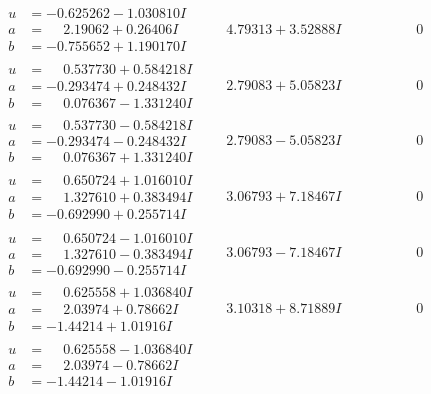 \documentclass[1p]{elsarticle_modified}
\theoremstyle{definition}
\begin{document}
$$\begin{array}{c|c|c}
\begin{aligned}
u &= -0.625262 - 1.030810 I \\
a &= \phantom{-}2.19062 + 0.26406 I \\
b &= -0.755652 + 1.190170 I\end{aligned}
 & \phantom{-}4.79313 + 3.52888 I & \phantom{-0.000000 } 0 \\ \hline\begin{aligned}
u &= \phantom{-}0.537730 + 0.584218 I \\
a &= -0.293474 + 0.248432 I \\
b &= \phantom{-}0.076367 - 1.331240 I\end{aligned}
 & \phantom{-}2.79083 + 5.05823 I & \phantom{-0.000000 } 0 \\ \hline\begin{aligned}
u &= \phantom{-}0.537730 - 0.584218 I \\
a &= -0.293474 - 0.248432 I \\
b &= \phantom{-}0.076367 + 1.331240 I\end{aligned}
 & \phantom{-}2.79083 - 5.05823 I & \phantom{-0.000000 } 0 \\ \hline\begin{aligned}
u &= \phantom{-}0.650724 + 1.016010 I \\
a &= \phantom{-}1.327610 + 0.383494 I \\
b &= -0.692990 + 0.255714 I\end{aligned}
 & \phantom{-}3.06793 + 7.18467 I & \phantom{-0.000000 } 0 \\ \hline\begin{aligned}
u &= \phantom{-}0.650724 - 1.016010 I \\
a &= \phantom{-}1.327610 - 0.383494 I \\
b &= -0.692990 - 0.255714 I\end{aligned}
 & \phantom{-}3.06793 - 7.18467 I & \phantom{-0.000000 } 0 \\ \hline\begin{aligned}
u &= \phantom{-}0.625558 + 1.036840 I \\
a &= \phantom{-}2.03974 + 0.78662 I \\
b &= -1.44214 + 1.01916 I\end{aligned}
 & \phantom{-}3.10318 + 8.71889 I & \phantom{-0.000000 } 0 \\ \hline\begin{aligned}
u &= \phantom{-}0.625558 - 1.036840 I \\
a &= \phantom{-}2.03974 - 0.78662 I \\
b &= -1.44214 - 1.01916 I\end{aligned}

\end{array}$$
\end{document}
